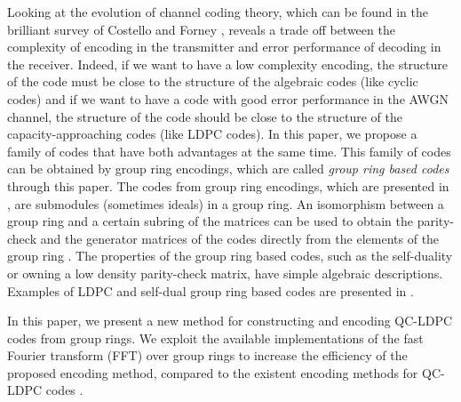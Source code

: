 \documentclass[journal,draftclsnofoot,onecolumn,12pt,twoside]{IEEEtran}
\begin{document}

Looking at the evolution of channel coding theory, which can be found in the brilliant survey of Costello and Forney  \cite{07}, reveals a trade off between the complexity of encoding in the transmitter and error performance of decoding in the receiver. Indeed, if we want to have a low complexity encoding, the structure of  the code must be close to the structure of the algebraic codes (like cyclic codes) and if we want to have a code with good error performance in the AWGN channel, the structure of the code should be close to the structure of the capacity-approaching codes (like LDPC codes). In this paper, we propose a family of codes that have both advantages at the same time. This family of codes can be obtained by group ring encodings, which are called  \emph{group ring based codes} through this paper. The codes from group ring encodings, which are presented in \cite{0,1}, are submodules (sometimes ideals) in a group ring.
An isomorphism between a group ring and a certain subring of the matrices can be used to obtain the parity-check and the generator matrices of the codes directly from the  elements of the group ring \cite{1}. The properties of the group ring based codes, such as the self-duality or owning a low density parity-check matrix, have simple algebraic descriptions. Examples of  LDPC and self-dual group ring based codes are presented in \cite{1}.

In this paper, we present a new method for constructing and encoding QC-LDPC codes from group rings. We exploit the available implementations of the fast Fourier transform (FFT) over group rings \cite{group_ring_FFT} to increase the efficiency of the proposed encoding method, compared to the  existent encoding methods for QC-LDPC codes \cite{4}.
\end{document}
